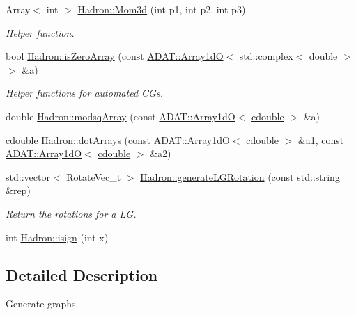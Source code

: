 \begin{DoxyCompactItemize}
Array$<$ int $>$ \mbox{\hyperlink{namespaceHadron_af72905f43cac8c79d2479565a6fe54d3}{Hadron\+::\+Mom3d}} (int p1, int p2, int p3)
\begin{DoxyCompactList}\small\item\em Helper function. \end{DoxyCompactList}\item 
bool \mbox{\hyperlink{namespaceHadron_a4c6b00854fd4dc574c56c8ddfd1a253f}{Hadron\+::is\+Zero\+Array}} (const \mbox{\hyperlink{classADAT_1_1Array1dO}{A\+D\+A\+T\+::\+Array1dO}}$<$ std\+::complex$<$ double $>$ $>$ \&a)
\begin{DoxyCompactList}\small\item\em Helper functions for automated C\+Gs. \end{DoxyCompactList}\item 
double \mbox{\hyperlink{namespaceHadron_a05c9899cc82acc7112a4df5dab534ee4}{Hadron\+::modsq\+Array}} (const \mbox{\hyperlink{classADAT_1_1Array1dO}{A\+D\+A\+T\+::\+Array1dO}}$<$ \mbox{\hyperlink{adat-devel_2main_2irreputils_2cgs__table_8cc_a5f9966666d076841002cd443622b7ccd}{cdouble}} $>$ \&a)
\item 
\mbox{\hyperlink{adat-devel_2main_2irreputils_2cgs__table_8cc_a5f9966666d076841002cd443622b7ccd}{cdouble}} \mbox{\hyperlink{namespaceHadron_aad081d14cd95160e164751fe86cff3af}{Hadron\+::dot\+Arrays}} (const \mbox{\hyperlink{classADAT_1_1Array1dO}{A\+D\+A\+T\+::\+Array1dO}}$<$ \mbox{\hyperlink{adat-devel_2main_2irreputils_2cgs__table_8cc_a5f9966666d076841002cd443622b7ccd}{cdouble}} $>$ \&a1, const \mbox{\hyperlink{classADAT_1_1Array1dO}{A\+D\+A\+T\+::\+Array1dO}}$<$ \mbox{\hyperlink{adat-devel_2main_2irreputils_2cgs__table_8cc_a5f9966666d076841002cd443622b7ccd}{cdouble}} $>$ \&a2)
\item 
std\+::vector$<$ Rotate\+Vec\+\_\+t $>$ \mbox{\hyperlink{namespaceHadron_a4467e73143184e2935f0f0f0e31079bc}{Hadron\+::generate\+L\+G\+Rotation}} (const std\+::string \&rep)
\begin{DoxyCompactList}\small\item\em Return the rotations for a LG. \end{DoxyCompactList}\item 
int \mbox{\hyperlink{namespaceHadron_ab7c3962155ebb71e6377424d11c29daa}{Hadron\+::isign}} (int x)
\end{DoxyCompactItemize}


\subsection{Detailed Description}
Generate graphs. 



